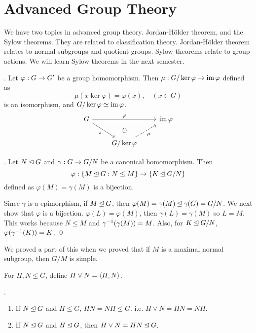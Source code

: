 \setcounter{chapter}{6}

\chapter{Advanced Group Theory}

We have two topics in advanced group theory. Jordan-Hölder theorem, and the Sylow theorems. They are related to classification theory. Jordan-Hölder theorem relates to normal subgroups and quotient groups. Sylow theorems relate to group actions. We will learn Sylow theorems in the next semester.

\setcounter{topic}{33}

\thm.  Let \(\varphi : G \rightarrow G'\) be a group homomorphism. Then \(\mu : G/ \ker \varphi \rightarrow \operatorname{im} \varphi\) defined as
\[
    \mu(x \ker\varphi) = \varphi(x), \quad (x \in G)
\]
is an isomorphism, and \(G / \ker \varphi \simeq \operatorname{im} \varphi\).
\[
    \begin{tikzcd}
        G \arrow{rr}{\varphi} \arrow[swap]{dr}{\pi} & \arrow[d, phantom, "\circlearrowright"]& \im \varphi \\
        & G/\ker\varphi \arrow[dashed,swap]{ur}{\mu} &
    \end{tikzcd}
\]

\lemma. Let \(N \unlhd G\) and \(\gamma : G \rightarrow G / N\) be a canonical homomorphism. Then
\[
    \varphi: \{M \unlhd G : N \leq M\} \rightarrow \{K \unlhd G/N\}
\]
defined as \(\varphi(M) = \gamma(M)\) is a bijection.

\pf Since \(\gamma\) is a epimorphism, if \(M \unlhd G\), then \(\varphi(M) = \gamma(M) \unlhd \gamma(G) = G/N\). We next show that \(\varphi\) is a bijection. \(\varphi(L) = \varphi(M)\), then \(\gamma(L) = \gamma(M)\) so \(L = M\). This works because \(N \leq M\) and \(\gamma^{-1}(\gamma(M)) = M\). Also, for \(K \unlhd G/N\), \(\varphi(\gamma^{-1}(K)) = K\). \qed

\recall We proved a part of this when we proved that if \(M\) is a maximal normal subgroup, then \(G/M\) is simple.

\notation For \(H, N \leq G\), define \(H \vee N = \left\langle H, N \right\rangle\).

\lemma.
\begin{enumerate}
    \item If \(N \unlhd G\) and \(H \leq G\), \(HN = NH \leq G\). i.e. \(H \vee N = HN = NH\).
    \item If \(N \unlhd G\) and \(H \unlhd G\), then \(H \vee N = HN \unlhd G\).
\end{enumerate}

